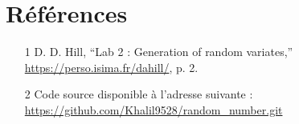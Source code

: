\documentclass[a4paper,12pt]{report}
\begin{document}
\newpage
\chapter*{Références}

\begin{itemize}
    \item [1] D. D. Hill, “Lab 2 : Generation of random variates,” \url{https://perso.isima.fr/dahill/}, p. 2.
    \item [2] Code source disponible à l'adresse suivante : \url{https://github.com/Khalil9528/random_number.git}
\end{itemize}
\end{document}
